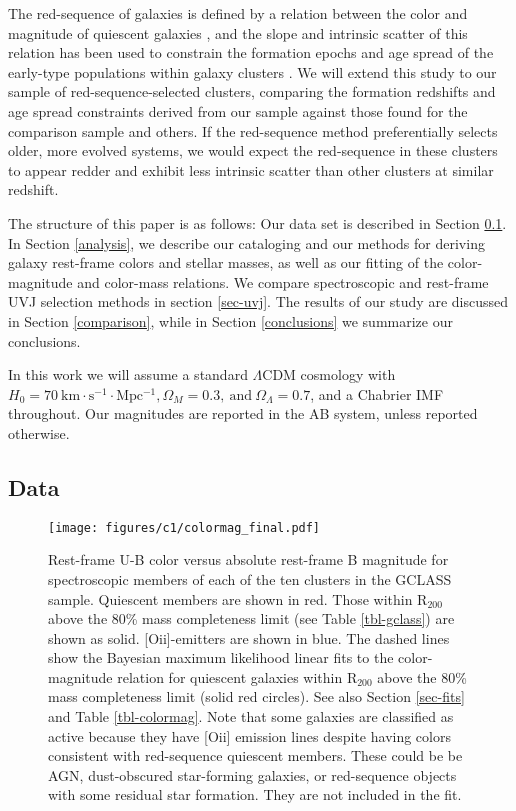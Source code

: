 The red-sequence of galaxies is defined by a relation between the color and magnitude of quiescent galaxies \citep{Bower:1992mb,van-Dokkum:1998wd,Baldry:2004oq,Bell:2004qe}, and the slope and intrinsic scatter of this relation has been used to constrain the formation epochs and age spread of the early-type populations within galaxy clusters \citep{Bower:1998cr,2003ApJ...596L.143B,Mei:2009wt}. We will extend this study to our sample of red-sequence-selected clusters, comparing the formation redshifts and age spread constraints derived from our sample against those found for the comparison sample and others. If the red-sequence method preferentially selects older, more evolved systems, we would expect the red-sequence in these clusters to appear redder and exhibit less intrinsic scatter than other clusters at similar redshift.

The structure of this paper is as follows:
Our data set is described in Section \ref{data}.
In Section \ref{analysis}, we describe our cataloging and our methods for deriving galaxy rest-frame colors and stellar masses, as well as our fitting of the color-magnitude and color-mass relations. We compare spectroscopic and rest-frame UVJ selection methods in section \ref{sec-uvj}.
The results of our study are discussed in Section \ref{comparison}, while in Section \ref{conclusions} we summarize our conclusions.

In this work we will assume a standard $\Lambda$CDM cosmology with $H_0 = 70 \mathrm{\ km \cdot s^{-1} \cdot Mpc^{-1}}, \Omega_M = 0.3, \mathrm{\ and\ } \Omega_\Lambda = 0.7$, and a Chabrier IMF \citep{chabrierimf} throughout. Our magnitudes are reported in the AB system, unless reported otherwise.

\subsection{Data}\label{data}
\begin{figure*}
\centering \texttt{[image: figures/c1/colormag\_final.pdf]}
\caption[Color-magnitude diagram for the GCLASS cluster sample]{Rest-frame U-B color versus absolute rest-frame B magnitude for spectroscopic members of each of the ten clusters in the GCLASS sample.
Quiescent members are shown in red. Those within R$_{200}$ above the 80\% mass completeness limit (see Table \ref{tbl-gclass}) are shown as solid. [O{\sc ii}]-emitters are shown in blue. The dashed lines show the Bayesian maximum likelihood linear fits to the color-magnitude relation for quiescent galaxies within R$_{200}$ above the 80\% mass completeness limit (solid red circles). See also Section \ref{sec-fits} and Table \ref{tbl-colormag}.
Note that some galaxies are classified as active because they have [O{\sc ii}] emission lines despite having colors consistent with red-sequence quiescent members. These could be be AGN, dust-obscured star-forming galaxies, or red-sequence objects with some residual star formation. They are not included in the fit.\label{fig-colormag}}
\end{figure*}

